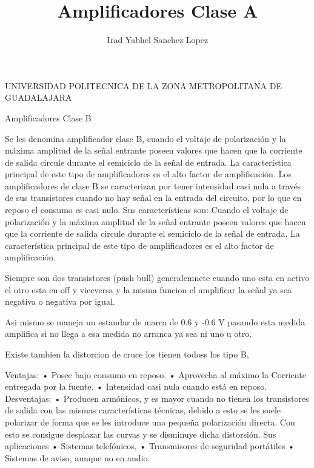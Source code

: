 \documentclass[10pt,a4paper]{article}
\author{Irad Yabhel Sanchez Lopez}
\title{Amplificadores Clase A }
\begin{document}
UNIVERSIDAD POLITECNICA DE LA ZONA METROPOLITANA DE GUADALAJARA


Amplificadores Clase B

Se les denomina amplificador clase B, cuando el voltaje de polarización y la máxima amplitud de la señal entrante poseen valores que hacen que la corriente de salida circule durante el semiciclo de la señal de entrada. La característica principal de este tipo de amplificadores es el alto factor de amplificación.
Los amplificadores de clase B se caracterizan por tener intensidad casi nula a través de sus transistores cuando no hay señal en la entrada del circuito, por lo que en reposo el consumo es casi nulo.
Sus características son:
Cuando el voltaje de polarización y la máxima amplitud de la señal entrante poseen valores que hacen que la corriente de salida circule durante el semiciclo de la señal de entrada.
La característica principal de este tipo de amplificadores es el alto factor de amplificación.

Siempre son dos transistores (push bull) generalemnete cuando uno esta en activo el otro esta en off y viceversa y la misma funcion el amplificar la señal ya sea negativa o negativa por igual.

Asi mismo se maneja un estandar de marca de 0.6 y -0.6 V pasando esta medida amplifica si no llega a esa medida no arranca ya sea ni uno u otro.

Existe tambien la distorcion de cruce los tienen todoss los tipo B, 


 
Ventajas:
•	Posee bajo consumo en reposo.
•	Aprovecha al máximo la Corriente entregada por la fuente.
•	Intensidad casi nula cuando está en reposo.
Desventajas:
•	Producen armónicos, y es mayor cuando no tienen los transistores de salida con las mismas características técnicas, debido a esto se les suele polarizar de forma que se les introduce una pequeña polarización directa. Con esto se consigue desplazar las curvas y se disminuye dicha distorsión.
Sus aplicaciones
•	Sistemas telefónicos,
•	Transmisores de seguridad portátiles
•	Sistemas de aviso, aunque no en audio.
\end{document}
